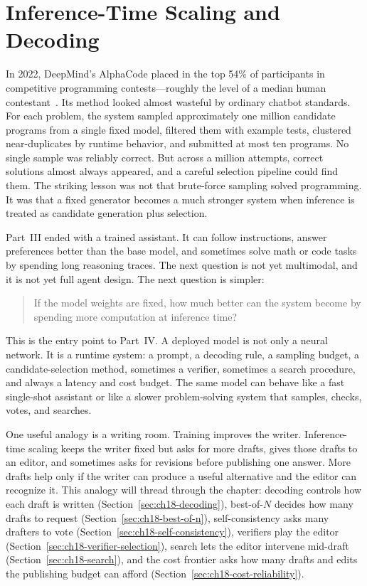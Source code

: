\chapter{Inference-Time Scaling and Decoding}
\label{ch:inference-time-scaling}
\raggedbottom

In 2022, DeepMind's AlphaCode placed in the top 54\% of participants in competitive programming contests---roughly the level of a median human contestant~\cite{li2022competition}. Its method looked almost wasteful by ordinary chatbot standards. For each problem, the system sampled approximately one million candidate programs from a single fixed model, filtered them with example tests, clustered near-duplicates by runtime behavior, and submitted at most ten programs. No single sample was reliably correct. But across a million attempts, correct solutions almost always appeared, and a careful selection pipeline could find them. The striking lesson was not that brute-force sampling solved programming. It was that a fixed generator becomes a much stronger system when inference is treated as candidate generation plus selection.

Part~III ended with a trained assistant. It can follow instructions, answer preferences better than the base model, and sometimes solve math or code tasks by spending long reasoning traces. The next question is not yet multimodal, and it is not yet full agent design. The next question is simpler:

\begin{quote}
If the model weights are fixed, how much better can the system become by spending more computation at inference time?
\end{quote}

This is the entry point to Part~IV. A deployed model is not only a neural network. It is a runtime system: a prompt, a decoding rule, a sampling budget, a candidate-selection method, sometimes a verifier, sometimes a search procedure, and always a latency and cost budget. The same model can behave like a fast single-shot assistant or like a slower problem-solving system that samples, checks, votes, and searches.

One useful analogy is a writing room. Training improves the writer. Inference-time scaling keeps the writer fixed but asks for more drafts, gives those drafts to an editor, and sometimes asks for revisions before publishing one answer. More drafts help only if the writer can produce a useful alternative and the editor can recognize it. This analogy will thread through the chapter: decoding controls how each draft is written (Section~\ref{sec:ch18-decoding}), best-of-$N$ decides how many drafts to request (Section~\ref{sec:ch18-best-of-n}), self-consistency asks many drafters to vote (Section~\ref{sec:ch18-self-consistency}), verifiers play the editor (Section~\ref{sec:ch18-verifier-selection}), search lets the editor intervene mid-draft (Section~\ref{sec:ch18-search}), and the cost frontier asks how many drafts and edits the publishing budget can afford (Section~\ref{sec:ch18-cost-reliability}).

